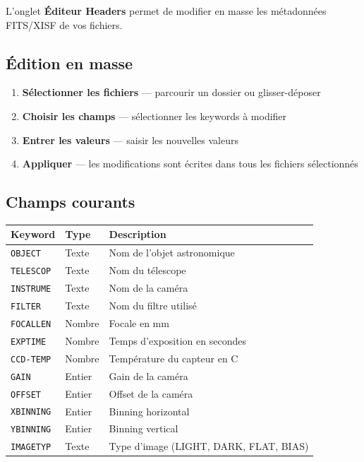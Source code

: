 \documentclass[a4paper,11pt]{article}
\begin{document}
L'onglet \textbf{\'{E}diteur Headers} permet de modifier en masse les m\'{e}tadonn\'{e}es FITS/XISF de vos fichiers.

\subsection{\'{E}dition en masse}

\begin{enumerate}
    \item \textbf{S\'{e}lectionner les fichiers} --- parcourir un dossier ou glisser-d\'{e}poser
    \item \textbf{Choisir les champs} --- s\'{e}lectionner les keywords \`{a} modifier
    \item \textbf{Entrer les valeurs} --- saisir les nouvelles valeurs
    \item \textbf{Appliquer} --- les modifications sont \'{e}crites dans tous les fichiers s\'{e}lectionn\'{e}s
\end{enumerate}

\subsection{Champs courants}

\begin{center}
\begin{tabularx}{\textwidth}{l l X}
\toprule
\textbf{Keyword} & \textbf{Type} & \textbf{Description} \\
\midrule
\texttt{OBJECT} & Texte & Nom de l'objet astronomique \\
\texttt{TELESCOP} & Texte & Nom du t\'{e}lescope \\
\texttt{INSTRUME} & Texte & Nom de la cam\'{e}ra \\
\texttt{FILTER} & Texte & Nom du filtre utilis\'{e} \\
\texttt{FOCALLEN} & Nombre & Focale en mm \\
\texttt{EXPTIME} & Nombre & Temps d'exposition en secondes \\
\texttt{CCD-TEMP} & Nombre & Temp\'{e}rature du capteur en \textdegree{}C \\
\texttt{GAIN} & Entier & Gain de la cam\'{e}ra \\
\texttt{OFFSET} & Entier & Offset de la cam\'{e}ra \\
\texttt{XBINNING} & Entier & Binning horizontal \\
\texttt{YBINNING} & Entier & Binning vertical \\
\texttt{IMAGETYP} & Texte & Type d'image (LIGHT, DARK, FLAT, BIAS) \\
\bottomrule
\end{tabularx}
\end{center}
\end{document}
